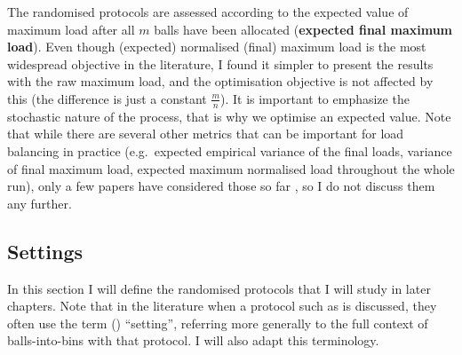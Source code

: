 \begin{itemize}
    The randomised protocols are assessed according to the expected value of maximum load after all $m$ balls have been allocated (\textbf{expected final maximum load}). Even though (expected) normalised (final) maximum load is the most widespread objective in the literature, I found it simpler to present the results with the raw maximum load, and the optimisation objective is not affected by this (the difference is just a constant $\frac{m}{n}$). It is important to emphasize the stochastic nature of the process, that is why we optimise an expected value. Note that while there are several other metrics that can be important for load balancing in practice (e.g.\ expected empirical variance of the final loads, variance of final maximum load, expected maximum normalised load throughout the whole run), only a few papers have considered those so far \cite{feldheim2021longtermthinning}, so I do not discuss them any further. 
    
\end{itemize}





\subsection{Settings} \label{settings}

In this section I will define the randomised protocols that I will study in later chapters. Note that in the literature when a protocol such as \TwoThinning is discussed, they often use the term (\TwoThinning) ``setting'', referring more generally to the full context of balls-into-bins with that protocol. I will also adapt this terminology.

\paragraph{\OneChoice}

